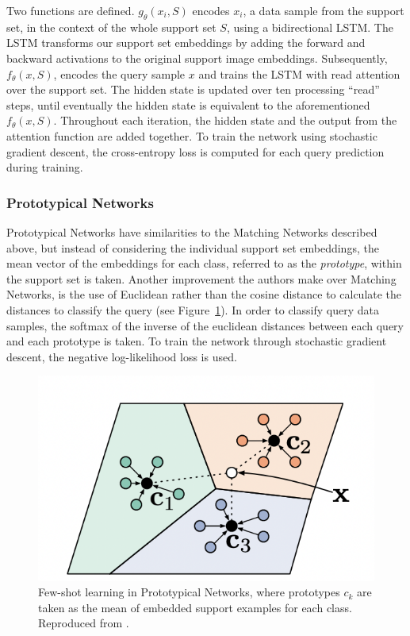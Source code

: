 Two functions are defined. $g_\theta(x_i, S)$ encodes $x_i$, a data sample from the support set, in the context of the whole support set $S$, using a bidirectional LSTM. The LSTM transforms our support set embeddings by adding the forward and backward activations to the original support image embeddings. Subsequently, $f_\theta(x, S)$, encodes the query sample $x$ and trains the LSTM with read attention over the support set. The hidden state is updated over ten processing ``read'' steps, until eventually the hidden state is equivalent to the aforementioned $f_\theta(x, S)$. Throughout each iteration, the hidden state and the output from the attention function are added together. To train the network using stochastic gradient descent, the cross-entropy loss is computed for each query prediction during training.

\subsubsection{Prototypical Networks}

Prototypical Networks \citep{snell2017prototypical} have similarities to the Matching Networks described above, but instead of considering the individual support set embeddings, the mean vector of the embeddings for each class, referred to as the \textit{prototype}, within the support set is taken. Another improvement the authors make over Matching Networks, is the use of Euclidean rather than the cosine distance to calculate the distances to classify the query (see Figure~\ref{fig:protonets}). In order to classify query data samples, the softmax of the inverse of the euclidean distances between each query and each prototype is taken. To train the network through stochastic gradient descent, the negative log-likelihood loss is used. 

\begin{figure}[!ht]
	\centering
	\includegraphics[width=0.7\linewidth]{img/protonets.png}
	\caption{Few-shot learning in Prototypical Networks, where prototypes \textbf{$c_k$} are taken as the mean of embedded support examples for each class. Reproduced from \citet{snell2017prototypical}.}
	\label{fig:protonets}
\end{figure}

